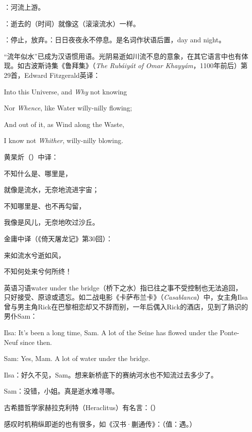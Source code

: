 {
\item {}：河流上游。
\item {}：逝去的（时间）就像这（滚滚流水）一样。
\item {}：停止，放弃。：日日夜夜永不停息。是名词作状语后置，day and night。
}
{
“流年似水”已成为汉语惯用语。光阴易逝如川流不息的意象，在其它语言中也有体现。如古波斯诗集《鲁拜集》（\emph{The Rubáiyát of Omar Khayyám}，1100年前后）第29首，Edward Fitzgerald英译：
\begin{lyquotepoeme}
Into this Universe, and \emph{Why} not knowing

Nor \emph{Whence}, like Water willy-nilly flowing;

And out of it, as Wind along the Waste,

I know not \emph{Whither}, willy-nilly blowing.
\end{lyquotepoeme}
黄杲炘（）中译：
\begin{lyquotepoem}
不知什么是、哪里是，

就像是流水，无奈地流进宇宙；

不知哪里是、也不再勾留，

我像是风儿，无奈地吹过沙丘。
\end{lyquotepoem}
金庸中译（《倚天屠龙记》第30回）：
\begin{lyquotepoem}
来如流水兮逝如风，

不知何处来兮何所终！
\end{lyquotepoem}

英语习语water under the bridge（桥下之水）指已往之事不受控制也无法追回，只好接受、原谅或遗忘。如二战电影《卡萨布兰卡》（\emph{Casablanca}）中，女主角Ilsa曾与男主角Rick在巴黎相恋却又不辞而别，一年后偶入Rick的酒店，见到了熟识的男仆Sam：

\begin{lyquotepara}
Ilsa: It's been a long time, Sam. A lot of the Seine has flowed under the Ponte-Neuf since then.

Sam: Yes, Mam. A lot of water under the bridge.

Ilsa：好久不见，Sam。想来新桥底下的赛纳河水也不知流过去多少了。

Sam：没错，小姐。真是逝水难寻哪。
\end{lyquotepara}

古希腊哲学家赫拉克利特（Heraclitus）有名言：（）

感叹时机稍纵即逝的也有很多，如《汉书·蒯通传》：（值：遇。）
}


